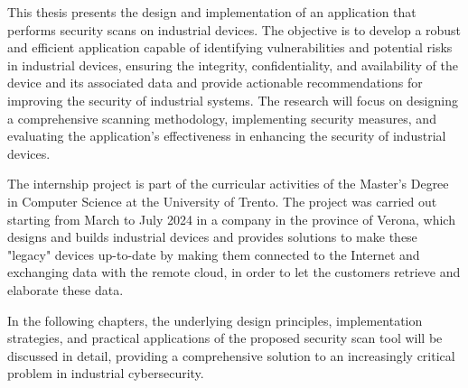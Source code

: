 This thesis presents the design and implementation of an application that performs security scans on industrial devices. The objective is to develop a robust and efficient application capable of identifying vulnerabilities and potential risks in industrial devices, ensuring the integrity, confidentiality, and availability of the device and its associated data and provide actionable recommendations for improving the security of industrial systems. The research will focus on designing a comprehensive scanning methodology, implementing security measures, and evaluating the application's effectiveness in enhancing the security of industrial devices.

The internship project is part of the curricular activities of the Master's Degree in Computer Science at the University of Trento. The project was carried out starting from March to July 2024 in a company in the province of Verona, which designs and builds industrial devices and provides solutions to make these "legacy" devices up-to-date by making them connected to the Internet and exchanging data with the remote cloud, in order to let the customers retrieve and elaborate these data.

In the following chapters, the underlying design principles, implementation strategies, and practical applications of the proposed security scan tool will be discussed in detail, providing a comprehensive solution to an increasingly critical problem in industrial cybersecurity.
